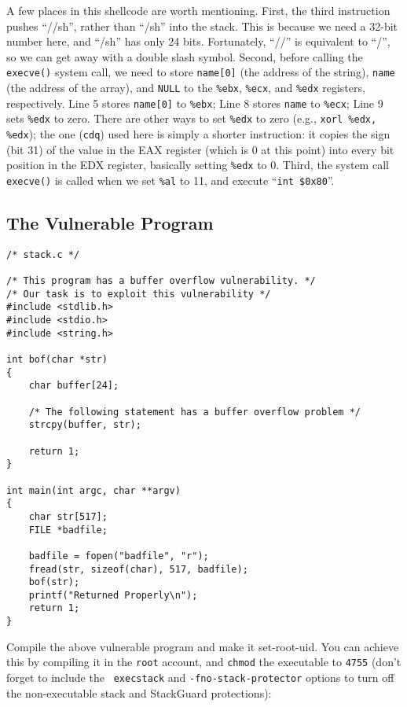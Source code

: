 A few places in this shellcode are worth mentioning. First, 
the third instruction pushes ``//sh'', rather than ``/sh'' into the 
stack. This is because we need a 32-bit number here, and ``/sh'' 
has only 24 bits. Fortunately, ``//'' is equivalent to ``/'', so we can get 
away with a double slash symbol. Second, before calling the {\tt execve()}
system call, we need to store {\tt name[0]} (the address of the string), 
{\tt name} (the address of the array), and {\tt NULL} to
the {\tt \%ebx}, {\tt \%ecx}, and {\tt \%edx} registers, respectively. 
Line 5 stores {\tt name[0]} to {\tt \%ebx}; 
Line 8 stores {\tt name} to    {\tt \%ecx}; 
Line 9 sets {\tt \%edx} to zero. There are other ways to set {\tt \%edx}
to zero (e.g., {\tt xorl \%edx, \%edx}); the one ({\tt cdq}) used here
is simply a shorter instruction: it copies the sign (bit 31) of the value in the EAX
register (which is 0 at this point) into every bit position in the EDX
register, basically setting {\tt \%edx} to 0.
Third, the system call {\tt execve()} is called when we set {\tt \%al} to
11, and execute ``{\tt int \$0x80}''.

\subsection{The Vulnerable Program}

\begin{verbatim}
/* stack.c */

/* This program has a buffer overflow vulnerability. */
/* Our task is to exploit this vulnerability */
#include <stdlib.h>
#include <stdio.h>
#include <string.h>

int bof(char *str)
{
    char buffer[24];

    /* The following statement has a buffer overflow problem */ 
    strcpy(buffer, str);

    return 1;
}

int main(int argc, char **argv)
{
    char str[517];
    FILE *badfile;

    badfile = fopen("badfile", "r");
    fread(str, sizeof(char), 517, badfile);
    bof(str);
    printf("Returned Properly\n");
    return 1;
}
\end{verbatim}

Compile the above vulnerable program and make it set-root-uid. You
can achieve this by compiling it in the {\tt root} account, and 
{\tt chmod} the executable to {\tt 4755} (don't forget to include the {\tt
execstack} and {\tt -fno-stack-protector} options to turn off
the non-executable stack and StackGuard protections):

